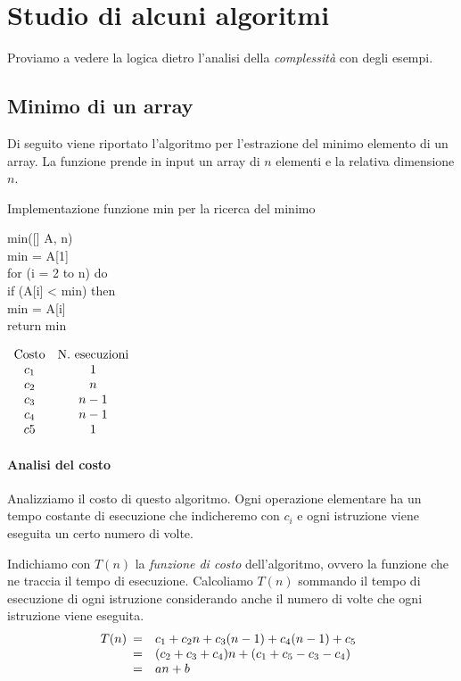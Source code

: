 \section{Studio di alcuni algoritmi}
Proviamo a vedere la logica dietro l'analisi della \emph{complessità} con degli
esempi.
\subsection{Minimo di un array}
Di seguito viene riportato l'algoritmo per l'estrazione del minimo elemento di
un array. La funzione prende in input un array di $n$ elementi e la relativa
dimensione $n$.

\begin{code}{Implementazione funzione min per la ricerca del minimo}
\begin{minipage}[t]{0.66\textwidth}
\ind{} min([] A,  n)\\
     min = A[1]\\
    \indf for (i = 2 to n) do\\
        \indff if (A[i] < min) then\\
            min = A[i]\\
    \indf return min
\end{minipage}
\hfill
\begin{minipage}[t]{0.32\textwidth}
    $\begin{array}[t]{cc}
        \text{Costo} & \text{N. esecuzioni}\\
        c_1 & 1\\
        c_2 & n\\
        c_3 & n-1\\
        c_4 & n-1\\
        c5 & 1
    \end{array}$
\end{minipage}
\end{code}

\paragraph{Analisi del costo}
Analizziamo il costo di questo algoritmo. Ogni operazione elementare ha un tempo
costante di esecuzione che indicheremo con $c_i$ e ogni istruzione viene eseguita
un certo numero di volte.

\newpage\noindent
Indichiamo con $T(n)$ la \emph{funzione di costo} dell'algoritmo,
ovvero la funzione che ne traccia il tempo di esecuzione. Calcoliamo $T(n)$
sommando il tempo di esecuzione di ogni istruzione considerando anche il numero
di volte che ogni istruzione viene eseguita.
\[T(n)\begin{array}[t]{cl}
    = & c_1+c_2n+c_3(n-1)+c_4(n-1)+c_5\\
    = & (c_2+c_3+c_4)n+(c_1+c_5-c_3-c_4)\\
    = & an+b
\end{array}\]

